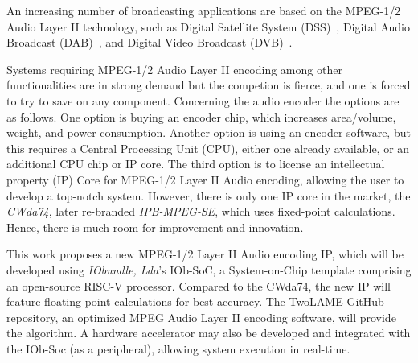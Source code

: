 

An increasing number of broadcasting applications are based on the MPEG-1/2
Audio Layer II technology, such as Digital Satellite System (DSS)~\cite{dss},
Digital Audio Broadcast (DAB)~\cite{dab}, and Digital Video Broadcast
(DVB)~\cite{dvb}.

Systems requiring MPEG-1/2 Audio Layer II encoding among other functionalities
are in strong demand but the competion is fierce, and one is forced to try to
save on any component. Concerning the audio encoder the options are as
follows. One option is buying an encoder chip, which increases area/volume,
weight, and power consumption. Another option is using an encoder software, but
this requires a Central Processing Unit (CPU), either one already available, or
an additional CPU chip or IP core. The third option is to license an
intellectual property (IP) Core for MPEG-1/2 Layer II Audio encoding, allowing
the user to develop a top-notch system. However, there is only one IP core in
the market, the \textit{CWda74}, later re-branded \textit{IPB-MPEG-SE}, which
uses fixed-point calculations. Hence, there is much room for improvement and
innovation.

This work proposes a new MPEG-1/2 Layer II Audio encoding IP, which will be
developed using \textit{IObundle, Lda}'s IOb-SoC, a System-on-Chip template
comprising an open-source RISC-V processor. Compared to the CWda74, the new IP
will feature floating-point calculations for best accuracy. The TwoLAME GitHub
repository, an optimized MPEG Audio Layer II encoding software, will provide the
algorithm.  A hardware accelerator may also be developed and integrated with the
IOb-Soc (as a peripheral), allowing system execution in real-time.
